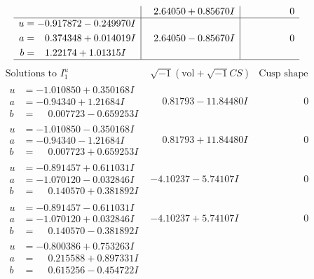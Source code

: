 \documentclass[1p]{elsarticle_modified}
\theoremstyle{definition}
\newcommand{\I}{\sqrt{-1}}
\begin{document}
$$\begin{array}{c|c|c}
 & \phantom{-}2.64050 + 0.85670 I & \phantom{-0.000000 } 0 \\ \hline\begin{aligned}
u &= -0.917872 - 0.249970 I \\
a &= \phantom{-}0.374348 + 0.014019 I \\
b &= \phantom{-}1.22174 + 1.01315 I\end{aligned}
 & \phantom{-}2.64050 - 0.85670 I & \phantom{-0.000000 } 0\\
 \hline 
 \end{array}$$\newpage$$\begin{array}{c|c|c}  
\text{Solutions to }I^u_{1}& \I (\text{vol} + \sqrt{-1}CS) & \text{Cusp shape}\\
 \hline 
\begin{aligned}
u &= -1.010850 + 0.350168 I \\
a &= -0.94340 + 1.21684 I \\
b &= \phantom{-}0.007723 - 0.659253 I\end{aligned}
 & \phantom{-}0.81793 - 11.84480 I & \phantom{-0.000000 } 0 \\ \hline\begin{aligned}
u &= -1.010850 - 0.350168 I \\
a &= -0.94340 - 1.21684 I \\
b &= \phantom{-}0.007723 + 0.659253 I\end{aligned}
 & \phantom{-}0.81793 + 11.84480 I & \phantom{-0.000000 } 0 \\ \hline\begin{aligned}
u &= -0.891457 + 0.611031 I \\
a &= -1.070120 - 0.032846 I \\
b &= \phantom{-}0.140570 + 0.381892 I\end{aligned}
 & -4.10237 - 5.74107 I & \phantom{-0.000000 } 0 \\ \hline\begin{aligned}
u &= -0.891457 - 0.611031 I \\
a &= -1.070120 + 0.032846 I \\
b &= \phantom{-}0.140570 - 0.381892 I\end{aligned}
 & -4.10237 + 5.74107 I & \phantom{-0.000000 } 0 \\ \hline\begin{aligned}
u &= -0.800386 + 0.753263 I \\
a &= \phantom{-}0.215588 + 0.897331 I \\
b &= \phantom{-}0.615256 - 0.454722 I\end{aligned}

\end{array}$$
\end{document}
